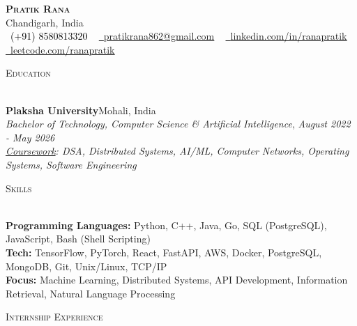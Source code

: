 \documentclass[a4paper]{article}
\newcommand{\tinyBulletSep} { \vspace{1.2mm} }
\newcommand{\sectionSep} { \vspace{\stretch{1}} }
\newcommand{\lineunder} {
    \vspace*{-8pt} \\
    \hspace*{-15pt} \hrulefill \\
}
\newcommand{\header} [1] {
    {\hspace*{-18pt}\vspace*{6pt} {
        \fontfamily{qcs}\selectfont \large \scshape #1
    }}
    \vspace*{-6pt} \lineunder
    \vspace{1.1mm}
}
\newcommand{\educationItem}[6]{
    \textbf{#1}\hfill #2\\
    \textit{#3}, \textit{#4} \hfill \textit{#5}\\
    #6
}
\begin{document}

\begin{center}
    {\textbf{\Huge \scshape Pratik Rana}} \\ \vspace{1pt}
    Chandigarh, India \\
    \small \textcolor{black}{\raisebox{-0.1\height}\faPhone\
        (+91) 8580813320} ~ \href{mailto:pratikrana862@gmail.com}{{\raisebox{-0.2\height}\faEnvelope\  \underline{pratikrana862@gmail.com}}} ~
    \href{https://www.linkedin.com/in/ranapratik/}{{\raisebox{-0.2\height}\faLinkedinSquare\ \underline{linkedin.com/in/ranapratik}}}  ~
    \href{https://leetcode.com/u/ranapratik/}{{\raisebox{-0.2\height}\faCode\ \underline{leetcode.com/ranapratik}}}
\end{center}

\vspace{-2mm}

\hypersetup {
    urlcolor     = blue, %
}


\header{Education}

\educationItem{Plaksha University}{Mohali, India}{Bachelor of Technology, Computer Science \& Artificial Intelligence}{}{August 2022 - May 2026}{
    \tinyBulletSep
    \textit{\underline{Coursework}: DSA, Distributed Systems, AI/ML, Computer Networks, Operating Systems, Software Engineering}
}

\sectionSep


\sectionSep


\header{Skills}

\textbf{Programming Languages:}  Python, C++, Java, Go, SQL (PostgreSQL), JavaScript, Bash (Shell Scripting)
\\
\textbf{Tech:} TensorFlow, PyTorch, React, FastAPI, AWS, Docker, PostgreSQL, MongoDB, Git, Unix/Linux, TCP/IP\\
\textbf{Focus:} Machine Learning, Distributed Systems, API Development, Information Retrieval, Natural Language Processing\\

\sectionSep


\header{Internship Experience}
\end{document}
